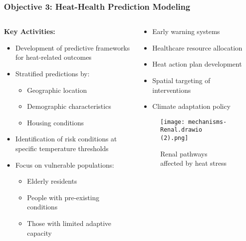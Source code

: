 \documentclass[aspectratio=169]{beamer}
\begin{document}
\begin{frame}
    \frametitle{Objective 3: Heat-Health Prediction Modeling}
    
    \begin{columns}[T]
        \begin{column}{0.55\textwidth}
            \textbf{\large Key Activities:}
            \begin{itemize}[leftmargin=*, itemsep=4pt]
                \item Development of predictive frameworks for heat-related outcomes
                \item Stratified predictions by:
                \begin{itemize}[itemsep=2pt]
                    \item Geographic location
                    \item Demographic characteristics
                    \item Housing conditions
                \end{itemize}
                \item Identification of risk conditions at specific temperature thresholds
                \item Focus on vulnerable populations:
                \begin{itemize}[itemsep=2pt]
                    \item Elderly residents
                    \item People with pre-existing conditions
                    \item Those with limited adaptive capacity
                \end{itemize}
            \end{itemize}
        \end{column}
        \begin{column}{0.42\textwidth}
            \begin{impactbox}
                \begin{itemize}[leftmargin=*, itemsep=3pt]
                    \item Early warning systems
                    \item Healthcare resource allocation
                    \item Heat action plan development
                    \item Spatial targeting of interventions
                    \item Climate adaptation policy
                \end{itemize}
            \end{impactbox}
            
            \vspace{-0.2cm}
            \begin{figure}
                \texttt{[image: mechanisms-Renal.drawio (2).png]}
                \caption{\small Renal pathways affected by heat stress}
            \end{figure}
        \end{column}
    \end{columns}
\end{frame}
\end{document}
